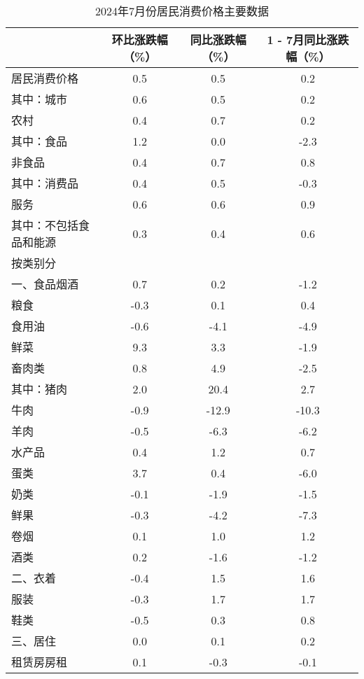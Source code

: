\begin{table}[h]
    \centering
    \caption{2024年7月份居民消费价格主要数据}
    \footnotesize %
    \begin{tabular}{lccc}
        \toprule
        & 环比涨跌幅（\%） & 同比涨跌幅（\%） & 1 - 7月同比涨跌幅（\%） \\
        \midrule
        居民消费价格 & 0.5 & 0.5 & 0.2 \\
        其中：城市 & 0.6 & 0.5 & 0.2 \\
        农村 & 0.4 & 0.7 & 0.2 \\
        其中：食品 & 1.2 & 0.0 & -2.3 \\
        非食品 & 0.4 & 0.7 & 0.8 \\
        其中：消费品 & 0.4 & 0.5 & -0.3 \\
        服务 & 0.6 & 0.6 & 0.9 \\
        其中：不包括食品和能源 & 0.3 & 0.4 & 0.6 \\
        \midrule
        按类别分 & & & \\
        一、食品烟酒 & 0.7 & 0.2 & -1.2 \\
        粮食 & -0.3 & 0.1 & 0.4 \\
        食用油 & -0.6 & -4.1 & -4.9 \\
        鲜菜 & 9.3 & 3.3 & -1.9 \\
        畜肉类 & 0.8 & 4.9 & -2.5 \\
        其中：猪肉 & 2.0 & 20.4 & 2.7 \\
        牛肉 & -0.9 & -12.9 & -10.3 \\
        羊肉 & -0.5 & -6.3 & -6.2 \\
        水产品 & 0.4 & 1.2 & 0.7 \\
        蛋类 & 3.7 & 0.4 & -6.0 \\
        奶类 & -0.1 & -1.9 & -1.5 \\
        鲜果 & -0.3 & -4.2 & -7.3 \\
        卷烟 & 0.1 & 1.0 & 1.2 \\
        酒类 & 0.2 & -1.6 & -1.2 \\
        \midrule
        二、衣着 & -0.4 & 1.5 & 1.6 \\
        服装 & -0.3 & 1.7 & 1.7 \\
        鞋类 & -0.5 & 0.3 & 0.8 \\
        \midrule
        三、居住 & 0.0 & 0.1 & 0.2 \\
        租赁房房租 & 0.1 & -0.3 & -0.1 \\

\end{tabular}
\end{table}
